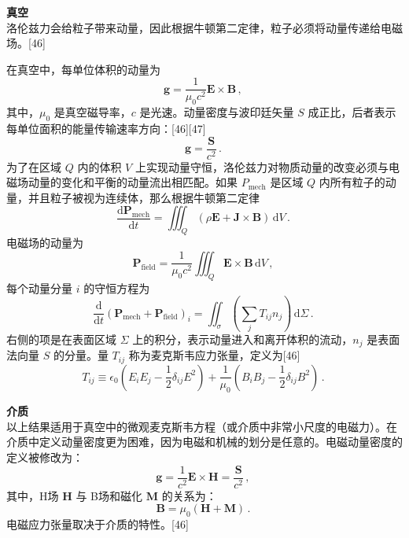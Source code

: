 \textbf{真空}\\
洛伦兹力会给粒子带来动量，因此根据牛顿第二定律，粒子必须将动量传递给电磁场。[46]

在真空中，每单位体积的动量为
\[
\mathbf{g} = \frac{1}{\mu_0 c^2} \mathbf{E} \times \mathbf{B} \,,~
\]
其中，\(\mu_0\) 是真空磁导率，\(c\) 是光速。动量密度与波印廷矢量 \(S\) 成正比，后者表示每单位面积的能量传输速率方向：[46][47]
\[
\mathbf{g} = \frac{\mathbf{S}}{c^2} \,.~
\]
为了在区域 \(Q\) 内的体积 \(V\) 上实现动量守恒，洛伦兹力对物质动量的改变必须与电磁场动量的变化和平衡的动量流出相匹配。如果 \(P_{\text{mech}}\) 是区域 \(Q\) 内所有粒子的动量，并且粒子被视为连续体，那么根据牛顿第二定律
\[
\frac{{\text{d}} \mathbf{P}_{\text{mech}}}{{\text{d}} t} = \iiint_Q \left( \rho \mathbf{E} + \mathbf{J} \times \mathbf{B} \right) \, \text{d}V \,.~
\]
电磁场的动量为
\[
\mathbf{P}_{\text{field}} = \frac{1}{\mu_0 c^2} \iiint_Q \mathbf{E} \times \mathbf{B} \, \text{d}V \,,~
\]
每个动量分量 \(i\) 的守恒方程为
\[
\frac{{\text{d}}}{{\text{d}}t} \left( \mathbf{P}_{\text{mech}} + \mathbf{P}_{\text{field}} \right)_i = \iint_{\sigma} \left( \sum_j T_{ij} n_j \right) \, \text{d}\Sigma \,.~
\]
右侧的项是在表面区域 \(\Sigma\) 上的积分，表示动量进入和离开体积的流动，\(n_j\) 是表面法向量 \(S\) 的分量。量 \(T_{ij}\) 称为麦克斯韦应力张量，定义为[46]
\[
T_{ij} \equiv \epsilon_0 \left( E_i E_j - \frac{1}{2} \delta_{ij} E^2 \right) + \frac{1}{\mu_0} \left( B_i B_j - \frac{1}{2} \delta_{ij} B^2 \right) \,.~
\]

\textbf{介质}\\
以上结果适用于真空中的微观麦克斯韦方程（或介质中非常小尺度的电磁力）。在介质中定义动量密度更为困难，因为电磁和机械的划分是任意的。电磁动量密度的定义被修改为：
\[
\mathbf{g} = \frac{1}{c^2} \mathbf{E} \times \mathbf{H} = \frac{\mathbf{S}}{c^2} \,,~
\]
其中，H场 \( \mathbf{H} \) 与 B场和磁化 \( \mathbf{M} \) 的关系为：
\[
\mathbf{B} = \mu_0 \left( \mathbf{H} + \mathbf{M} \right) \,.~
\]
电磁应力张量取决于介质的特性。[46]